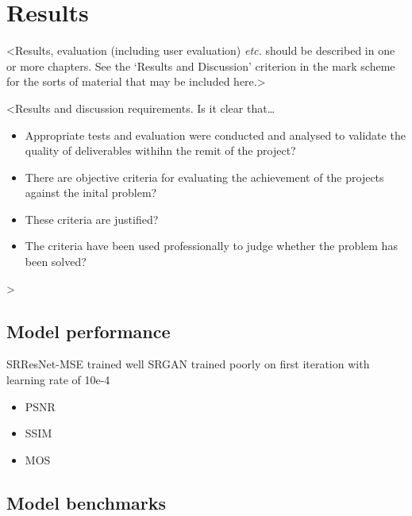 \chapter{Results}
\label{chapter3}

<Results, evaluation (including user evaluation) {\em etc.} should be described in one or more chapters. See the `Results and Discussion' criterion in the mark scheme for the sorts of material that may be included here.>

<Results and discussion requirements. Is it clear that\dots
\begin{itemize}
    \item Appropriate tests and evaluation were conducted and analysed to validate the quality of deliverables withihn the remit of the project?
    \item There are objective criteria for evaluating the achievement of the projects against the inital problem?
    \item These criteria are justified?
    \item The criteria have been used professionally to judge whether the problem has been solved?
\end{itemize}
>

\section{Model performance}

SRResNet-MSE trained well
SRGAN trained poorly on first iteration with learning rate of 10e-4
\begin{itemize}
    \item PSNR
    \item SSIM
    \item MOS
\end{itemize}
\lipsum[8]

\section{Model benchmarks}
\lipsum[12]
